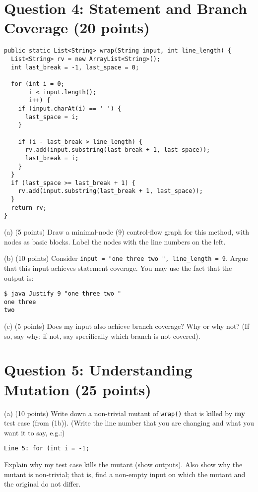 \documentclass[12pt]{article}
\begin{document}
\newpage
\section*{Question 4: Statement and Branch Coverage (20 points)}
\begin{lstlisting}
public static List<String> wrap(String input, int line_length) {
  List<String> rv = new ArrayList<String>();
  int last_break = -1, last_space = 0;
  
  for (int i = 0;
       i < input.length();
       i++) {
    if (input.charAt(i) == ' ') {
      last_space = i;
    }
    
    if (i - last_break > line_length) {
      rv.add(input.substring(last_break + 1, last_space));
      last_break = i;
    }
  }
  if (last_space >= last_break + 1) {
    rv.add(input.substring(last_break + 1, last_space));
  }
  return rv;
}
\end{lstlisting}

\vspace*{1em} \noindent
(a) (5 points) Draw a minimal-node (9) control-flow graph for this method, with
nodes as basic blocks. Label the nodes with the line numbers on the left.

\vspace*{1em} \noindent
(b) (10 points) Consider \verb+input = "one three two ", line_length = 9+.
Argue that this input achieves statement coverage. You may use the fact that the output is:
\begin{verbatim}
$ java Justify 9 "one three two "
one three 
two
\end{verbatim}

\vspace*{1em} \noindent
(c) (5 points) Does my input also achieve branch coverage? Why or why not? (If so, say why; if not,
say specifically which branch is not covered).

\newpage
\section*{Question 5: Understanding Mutation (25 points)}
(a) (10 points) Write down a non-trivial mutant of {\tt wrap()} that
is killed by {\bf my} test case (from (1b)). (Write the line number that you are changing
and what you want it to say, e.g.:)

\verb+Line 5: for (int i = -1;+

\noindent
Explain why my test case
kills the mutant (show outputs). Also show why the mutant is non-trivial; that is,
find a non-empty input on which the mutant and the original do not differ.
\end{document}
